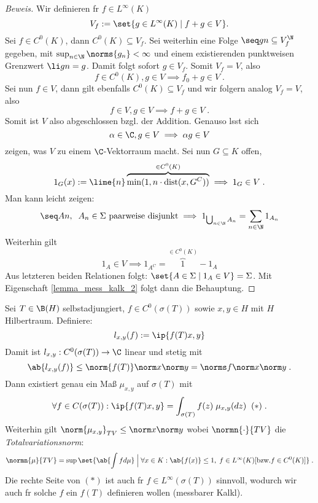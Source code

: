\begin{proof}[Beweis]
	Wir definieren f\us r \(f\in L^\infty(K)\)
	\[V_f := \set{g\in L^\infty(K)\;\vert\; f+g \in V}.\]
	Sei \(f\in C^0(K)\), dann \(C^0(K)\subseteq V_f\). Sei weiterhin eine Folge \(\seq gn \subseteq V_f^\N\) gegeben, mit \(\sup_{n\in\N} \norms{g_n} < \infty\) und einem existierenden punktweisen Grenzwert \(\li gn = g\). Damit folgt sofort \(g\in V_f\). Somit \(V_f = V\), also 
	\[f \in C^0(K), g\in V \implies f_0 + g \in V\;.\]
	Sei nun \(f\in V\), dann gilt ebenfalls \(C^0(K) \subseteq V_f\) und wir folgern analog \(V_f = V\), also 
	\[f\in V, g\in V \implies f + g \in V\;.\] 
	Somit ist $V$ also abgeschlossen bzgl. der Addition. Genauso l\as sst sich \[\alpha \in \C, g\in V \implies \alpha g \in V\] zeigen, was $V$ zu einem \(\C\)-Vektorraum macht.
	Sei nun \(G\subseteq K\) offen, 
	\[1_G(x) := \lime{n} \overbrace{\min(1,n\cdot \text{dist}(x, G^C))}^{\in C^0(K)} \implies 1_G \in V\;.\]
	Man kann leicht zeigen:
	\[\seq An,\;\; A_n \in \Sigma \text{ paarweise disjunkt} \implies 1_{\bigcup_{n\in\N} A_n} = \sum_{n\in\N} 1_{A_n}\]
	Weiterhin gilt
	\[1_A\in V \implies 1_{A^C} = \overbrace{1}^{\in C^0(K)}-1_A\]
	Aus letzteren beiden Relationen folgt: \(\set{A\in \Sigma \;\vert\; 1_A\in V} = \Sigma\). Mit Eigenschaft \ref{lemma_mess_kalk_2} folgt dann die Behauptung.
\end{proof}

\begin{rem}
	Sei \(T\in \B(H)\) selbstadjungiert, \(f\in C^0(\sigma(T))\) sowie \(x,y \in H\) mit $H$ Hilbertraum. Definiere:
	\[l_{x,y}(f):= \ip{f(T)x,y}\]
	Damit ist \(l_{x,y}:C^0(\sigma(T)) \to \C\) linear und stetig mit
	\[\ab{l_{x,y}(f)} \leq \norm{f(T)} \norm x\norm y = \norms f \norm x \norm y\;.\]
	Dann existiert genau ein Ma\ss{} $\mu_{x,y}$ auf \(\sigma(T)\) mit 
	\[\forall f \in C(\sigma(T)): \ip{f(T)x,y} = \int_{\sigma(T)} f(z) \;\mu_{x,y}(dz)\;\;(*)\;.\]
	Weiterhin gilt \(\norm{\mu_{x,y}}_{TV} \leq \norm x\norm y\) wobei $\normn{\cdot}{TV}$ die \textit{Totalvariationsnorm}:
	\[\normn{\mu}{TV} = \sup\set{\ab{\int fd\mu}\;\Big\vert\; \forall x \in K: \ab{f(x)} \leq 1, \;f \in L^\infty(K)[\text{bzw.} f\in C^0(K)]}\;.\]
	Die rechte Seite von $(*)$ ist auch f\us r $f\in L^\infty(\sigma(T))$ sinnvoll, wodurch wir auch f\us r solche $f$ ein $f(T)$ definieren wollen (messbarer Kalk\us l).
	\label{rem_mess_kalk}
\end{rem}

